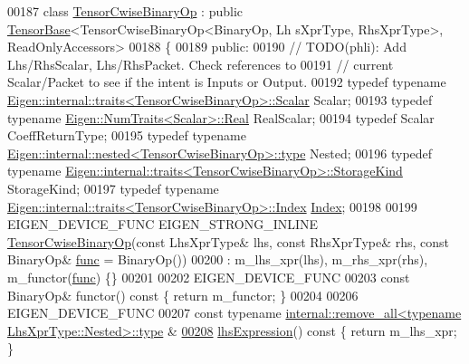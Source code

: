 \begin{DoxyCode}
00187 \textcolor{keyword}{class }\hyperlink{class_eigen_1_1_tensor_cwise_binary_op}{TensorCwiseBinaryOp} : \textcolor{keyword}{public} \hyperlink{class_eigen_1_1_tensor_base}{TensorBase}<TensorCwiseBinaryOp<BinaryOp, Lh
      sXprType, RhsXprType>, ReadOnlyAccessors>
00188 \{
00189   \textcolor{keyword}{public}:
00190     \textcolor{comment}{// TODO(phli): Add Lhs/RhsScalar, Lhs/RhsPacket.  Check references to}
00191     \textcolor{comment}{// current Scalar/Packet to see if the intent is Inputs or Output.}
00192     \textcolor{keyword}{typedef} \textcolor{keyword}{typename} \hyperlink{struct_eigen_1_1internal_1_1traits}{Eigen::internal::traits<TensorCwiseBinaryOp>::Scalar}
       Scalar;
00193     \textcolor{keyword}{typedef} \textcolor{keyword}{typename} \hyperlink{group___sparse_core___module}{Eigen::NumTraits<Scalar>::Real} RealScalar;
00194     \textcolor{keyword}{typedef} Scalar CoeffReturnType;
00195     \textcolor{keyword}{typedef} \textcolor{keyword}{typename} \hyperlink{class_eigen_1_1internal_1_1_tensor_lazy_evaluator_writable}{Eigen::internal::nested<TensorCwiseBinaryOp>::type}
       Nested;
00196     \textcolor{keyword}{typedef} \textcolor{keyword}{typename} \hyperlink{struct_eigen_1_1internal_1_1traits}{Eigen::internal::traits<TensorCwiseBinaryOp>::StorageKind}
       StorageKind;
00197     \textcolor{keyword}{typedef} \textcolor{keyword}{typename} \hyperlink{struct_eigen_1_1internal_1_1traits}{Eigen::internal::traits<TensorCwiseBinaryOp>::Index}
       \hyperlink{namespace_eigen_a62e77e0933482dafde8fe197d9a2cfde}{Index};
00198 
00199     EIGEN\_DEVICE\_FUNC EIGEN\_STRONG\_INLINE \hyperlink{class_eigen_1_1_tensor_cwise_binary_op}{TensorCwiseBinaryOp}(\textcolor{keyword}{const} LhsXprType& lhs, \textcolor{keyword}{
      const} RhsXprType& rhs, \textcolor{keyword}{const} BinaryOp& \hyperlink{structfunc}{func} = BinaryOp())
00200         : m\_lhs\_xpr(lhs), m\_rhs\_xpr(rhs), m\_functor(\hyperlink{structfunc}{func}) \{\}
00201 
00202     EIGEN\_DEVICE\_FUNC
00203     \textcolor{keyword}{const} BinaryOp& functor()\textcolor{keyword}{ const }\{ \textcolor{keywordflow}{return} m\_functor; \}
00204 
00206     EIGEN\_DEVICE\_FUNC
00207     \textcolor{keyword}{const} \textcolor{keyword}{typename} \hyperlink{group___sparse_core___module}{internal::remove\_all<typename LhsXprType::Nested>::type}
      &
\hyperlink{class_eigen_1_1_tensor_cwise_binary_op_abe293a3a1ee663b55c0363d2fb751397}{00208}     \hyperlink{class_eigen_1_1_tensor_cwise_binary_op_abe293a3a1ee663b55c0363d2fb751397}{lhsExpression}()\textcolor{keyword}{ const }\{ \textcolor{keywordflow}{return} m\_lhs\_xpr; \}

\end{DoxyCode}
